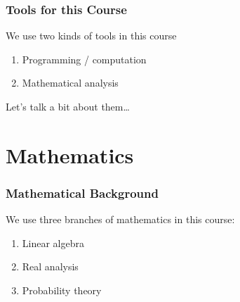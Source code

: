 \begin{frame}
    \frametitle{Tools for this Course}

    We use two kinds of tools in this course

    \begin{enumerate}
        \item Programming / computation
            \vspace{1em}
        \item Mathematical analysis
    \end{enumerate}

        \vspace{1em}
        \vspace{1em}

    Let's talk a bit about them\ldots

\end{frame}



\section{Mathematics}

\begin{frame}
    \frametitle{Mathematical Background}

    We use three branches of mathematics in this course:

    \begin{enumerate}
        \item Linear algebra 
            \vspace{0.5em}
        \item Real analysis
            \vspace{0.5em}
        \item Probability theory
    \end{enumerate}

\end{frame}


